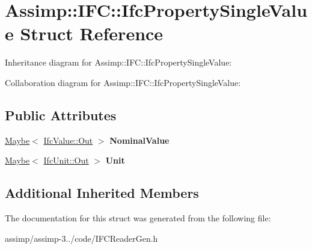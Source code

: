 \hypertarget{struct_assimp_1_1_i_f_c_1_1_ifc_property_single_value}{\section{Assimp\+:\+:I\+F\+C\+:\+:Ifc\+Property\+Single\+Value Struct Reference}
\label{struct_assimp_1_1_i_f_c_1_1_ifc_property_single_value}
}


Inheritance diagram for Assimp\+:\+:I\+F\+C\+:\+:Ifc\+Property\+Single\+Value\+:


Collaboration diagram for Assimp\+:\+:I\+F\+C\+:\+:Ifc\+Property\+Single\+Value\+:
\subsection*{Public Attributes}
\begin{DoxyCompactItemize}
\item 
\hypertarget{struct_assimp_1_1_i_f_c_1_1_ifc_property_single_value_a35c94c77622dcdb183b5450adec06eac}{\hyperlink{struct_assimp_1_1_s_t_e_p_1_1_maybe}{Maybe}$<$ \hyperlink{classboost_1_1shared__ptr}{Ifc\+Value\+::\+Out} $>$ {\bfseries Nominal\+Value}}\label{struct_assimp_1_1_i_f_c_1_1_ifc_property_single_value_a35c94c77622dcdb183b5450adec06eac}

\item 
\hypertarget{struct_assimp_1_1_i_f_c_1_1_ifc_property_single_value_a6590f232397a09995ca59601bd5b2526}{\hyperlink{struct_assimp_1_1_s_t_e_p_1_1_maybe}{Maybe}$<$ \hyperlink{classboost_1_1shared__ptr}{Ifc\+Unit\+::\+Out} $>$ {\bfseries Unit}}\label{struct_assimp_1_1_i_f_c_1_1_ifc_property_single_value_a6590f232397a09995ca59601bd5b2526}

\end{DoxyCompactItemize}
\subsection*{Additional Inherited Members}


The documentation for this struct was generated from the following file\+:\begin{DoxyCompactItemize}
\item 
assimp/assimp-\/3../code/I\+F\+C\+Reader\+Gen.\+h\end{DoxyCompactItemize}
